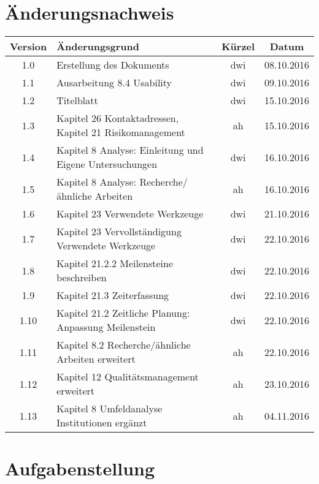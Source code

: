\documentclass[12pt, a4paper]{report}
\begin{document}
	\chapter{Änderungsnachweis}
	\begin{tabularx}{\linewidth}{|c|X|c|c|}
		\hline
		\textbf{Version} & \textbf{Änderungsgrund} & \textbf{Kürzel} & \textbf{Datum} \\
		\hline
		1.0 & Erstellung des Dokuments & dwi & 08.10.2016 \\
		\hline
		1.1 & Ausarbeitung 8.4 Usability & dwi & 09.10.2016 \\
		\hline
		1.2 & Titelblatt & dwi & 15.10.2016 \\
		\hline
		1.3 & Kapitel 26 Kontaktadressen, \newline Kapitel 21 Risikomanagement & ah & 15.10.2016 \\
		\hline
		1.4 & Kapitel 8 Analyse: Einleitung und Eigene Untersuchungen & dwi & 16.10.2016 \\
		\hline
		1.5 & Kapitel 8 Analyse: Recherche/ähnliche Arbeiten & ah & 16.10.2016 \\
		\hline
		1.6 & Kapitel 23 Verwendete Werkzeuge & dwi & 21.10.2016 \\
		\hline
		1.7 & Kapitel 23 Vervollständigung Verwendete Werkzeuge & dwi & 22.10.2016 \\
		\hline
		1.8 & Kapitel 21.2.2 Meilensteine beschreiben & dwi & 22.10.2016 \\
		\hline
		1.9 & Kapitel 21.3 Zeiterfassung & dwi & 22.10.2016 \\
		\hline
		1.10 & Kapitel 21.2 Zeitliche Planung: Anpassung Meilenstein & dwi & 22.10.2016 \\
		\hline
		1.11 & Kapitel 8.2 Recherche/ähnliche Arbeiten erweitert & ah & 22.10.2016 \\
		\hline
		1.12 & Kapitel 12 Qualitätsmanagement erweitert & ah & 23.10.2016 \\
		\hline
		1.13 & Kapitel 8 Umfeldanalyse Institutionen ergänzt & ah & 04.11.2016 \\
		\hline
	\end{tabularx}
	
	\listoftodos
	
	
	\tableofcontents
	
	
	\chapter{Aufgabenstellung}
	
\end{document}
